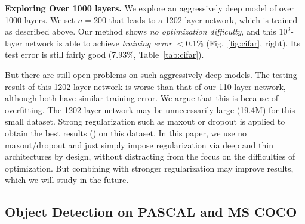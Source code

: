 \documentclass{article}
\begin{document}
\vspace{6pt}
\noindent\textbf{Exploring Over 1000 layers.}
We explore an aggressively deep model of over 1000 layers. We set $n=200$ that leads to a 1202-layer network, which is trained as described above. Our method shows \emph{no optimization difficulty}, and this $10^3$-layer network is able to achieve \emph{training error} $<$0.1\% (Fig.~\ref{fig:cifar}, right). Its test error is still fairly good (7.93\%, Table~\ref{tab:cifar}).

But there are still open problems on such aggressively deep models.
The testing result of this 1202-layer network is worse than that of our 110-layer network, although both have similar training error. We argue that this is because of overfitting.
The 1202-layer network may be unnecessarily large (19.4M) for this small dataset. Strong regularization such as maxout \cite{Goodfellow2013} or dropout \cite{Hinton2012} is applied to obtain the best results (\cite{Goodfellow2013,Lin2013,Lee2014,Romero2015}) on this dataset.
In this paper, we use no maxout/dropout and just simply impose regularization via deep and thin architectures by design, without distracting from the focus on the difficulties of optimization. But combining with stronger regularization may improve results, which we will study in the future.

\subsection{Object Detection on PASCAL and MS COCO}
\end{document}
